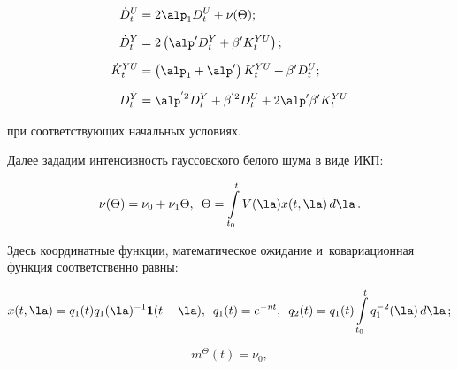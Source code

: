  \begin{align}

 \dot D_t^U &= 2\alp_1 D_t^U +\nu (\Theta);

 \label{e5.6-s}

\\[6pt]

  \dot D_t^Y &= 2\left( \alp' D_t^Y +\beta' K_t^{YU} \right);

  \label{e5.7-s}

  \\[6pt]

  \dot K_t^{YU} &= \left(\alp_1 +\alp'\right) K_t^{YU} + \beta' D_t^U;

  \label{e5.8-s}

   \\[6pt]

  D_t^{\dot Y} &=\alp^{'2} D_t^Y + \beta^{'2} D_t^U+ 2\alp'\beta' K_t^{YU}

  \label{e5.9-s}

 \end{align}

при соответствующих начальных условиях.

Далее зададим интенсивность гауссовского белого шума в виде ИКП:

 \begin{equation}

 \nu(\Theta) = \nu_0 +\nu_1\Theta,\enskip \Theta = \int\limits_{t_0}^t 

V(\la) x(t,\la) \,d\la\,.\label{e5.10-s}

 \end{equation}

Здесь координатные функции, математическое ожидание и~ковариационная функция соответственно равны:

   \begin{equation*}

    x(t,\la) = q_1(t) q_1(\la)^{-1} {\bf 1}(t-\la),

    \enskip

    q_1 (t) = e^{-\eta t},\enskip q_2 (t) = q_1 (t)\int\limits_{t_0}^t q_1^{-2} 

(\la) \,d\la\,;

\end{equation*}



\vspace*{-9pt}



\noindent

    \begin{equation*}

    m^\Theta (t) = \nu_0,

    \end{equation*}

